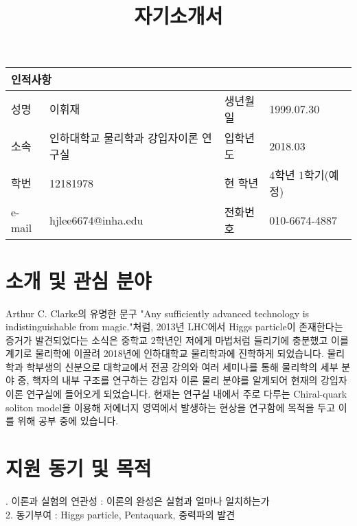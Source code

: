 \documentclass[aps,superscriptaddress,10pt]{revtex4-2}
\begin{document}
\title{자기소개서}
 \maketitle
 \begin{table}[ht]

    \begin{tabular}{|p{1.4cm}|p{5.5cm}|p{1.4cm}|p{5.5cm}|}
    \hline
    \multicolumn{4}{|p{3.5cm}|}{\textbf{\large 인적사항}} \\
    \hline
    \hline
    성명    & 이휘재 & 생년월일     & 1999.07.30 \\
    \hline
    소속    & 인하대학교 물리학과 강입자이론 연구실& 입학년도 & 2018.03 \\
    \hline
    학번    & 12181978 & 현 학년   & 4학년 1학기(예정) \\
    \hline
    e-mail    & hjlee6674@inha.edu & 전화번호 & 010-6674-4887 \\
    \hline
    \end{tabular}
    
    \end{table}


    
\section{소개 및 관심 분야}\small\noindent
Arthur C. Clarke의 유명한 문구
"Any sufficiently advanced technology is indistinguishable from magic."처럼,
2013년 LHC에서 Higgs particle이 존재한다는 증거가 발견되었다는 소식은 중학교 2학년인
저에게 마법처럼 들리기에 충분했고 이를 계기로 물리학에 이끌려 2018년에 인하대학교 물리학과에 
진학하게 되었습니다. 물리학과 학부생의 신분으로 대학교에서 전공 강의와 여러 세미나를 통해
물리학의 세부 분야 중, 핵자의 내부 구조를 연구하는 강입자 이론 물리 분야를 알게되어
현재의 강입자이론 연구실에 들어오게 되었습니다. 현재는 연구실 내에서 주로 다루는
Chiral-quark soliton model을 이용해 저에너지 영역에서 발생하는 현상을 연구함에 목적을
두고 이를 위해 공부 중에 있습니다.

\section{지원 동기 및 목적}. 이론과 실험의 연관성 : 이론의 완성은 실험과 얼마나 일치하는가
\\
2. 동기부여 : Higgs particle, Pentaquark, 중력파의 발견
\vfill
\end{document}
